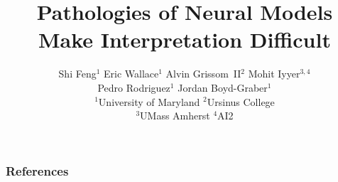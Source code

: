 \documentclass{beamer}
\title[EMNLP]{Pathologies of Neural Models Make Interpretation Difficult}
\author{
\small{
Shi Feng$^1$ Eric Wallace$^1$ Alvin Grissom~II$^2$ Mohit Iyyer$^{3,4}$ \\
Pedro Rodriguez$^1$ Jordan Boyd-Graber$^1$
} \\\vspace{10px}
\footnotesize{$^1$University of Maryland $^2$Ursinus College\\ $^3$UMass Amherst $^4$AI2}
}
\begin{document}
\begin{frame}
    \titlepage
\end{frame}










\begin{frame}[t, allowframebreaks]
\frametitle{References}

\small

\end{frame}
\end{document}
